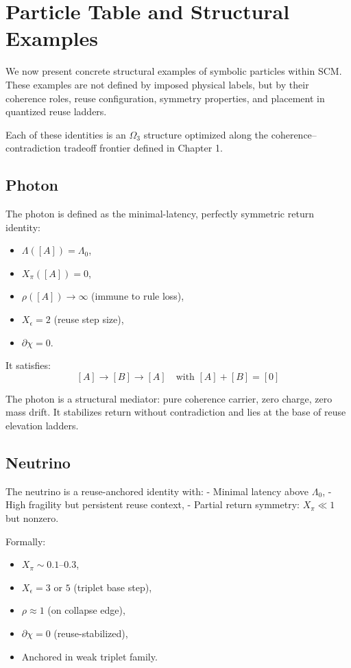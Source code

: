 \chapter{Particle Table and Structural Examples} \label{chapter-particle-table}

We now present concrete structural examples of symbolic particles within SCM. These examples are not defined by imposed physical labels, but by their coherence roles, reuse configuration, symmetry properties, and placement in quantized reuse ladders.

Each of these identities is an $\Omega_3$ structure optimized along the coherence–contradiction tradeoff frontier defined in Chapter 1.

\section{Photon} \label{sec:photon}

The photon is defined as the minimal-latency, perfectly symmetric return identity:

\begin{itemize}
  \item $\Lambda([A]) = \Lambda_0$,
  \item $X_\pi([A]) = 0$,
  \item $\rho([A]) \to \infty$ (immune to rule loss),
  \item $X_\epsilon = 2$ (reuse step size),
  \item $\partial\chi = 0$.
\end{itemize}

It satisfies:
\[
[A] \to [B] \to [A] \quad \text{with } [A] + [B] = [0]
\]

The photon is a structural mediator: pure coherence carrier, zero charge, zero mass drift. It stabilizes return without contradiction and lies at the base of reuse elevation ladders.

\section{Neutrino} \label{sec:neutrino}

The neutrino is a reuse-anchored identity with:
- Minimal latency above $\Lambda_0$,
- High fragility but persistent reuse context,
- Partial return symmetry: $X_\pi \ll 1$ but nonzero.

Formally:
\begin{itemize}
  \item $X_\pi \sim 0.1$–$0.3$,
  \item $X_\epsilon = 3$ or $5$ (triplet base step),
  \item $\rho \approx 1$ (on collapse edge),
  \item $\partial\chi = 0$ (reuse-stabilized),
  \item Anchored in weak triplet family.
\end{itemize}

